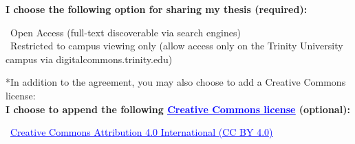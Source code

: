 \vspace{0.2in}
\textbf{I choose the following option for sharing my thesis (required):}

\checkedbox\ Open Access (full-text discoverable via search engines)\\
\emptybox\ Restricted to campus viewing only (allow access only on the Trinity
University campus via digitalcommons.trinity.edu)

\vspace{0.4in}
*In addition to the agreement, you may also choose to add a Creative Commons
license:\\
\textbf{I choose to append the following
\href{https://creativecommons.org/licenses/}{\textcolor{blue}{\uline{Creative Commons license}}}
(optional):}

\checkedbox\ \href{https://creativecommons.org/licenses/by/4.0/}{\textcolor{blue}{\uline{Creative Commons Attribution 4.0 International (CC BY 4.0)}}}

\endgroup
\clearpage

